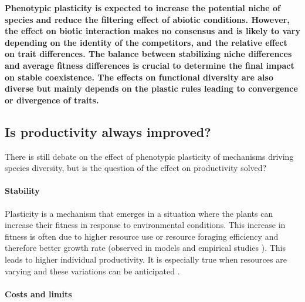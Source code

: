 

\textbf{Phenotypic plasticity is expected to increase the potential niche of species and reduce the filtering effect of abiotic conditions. However, the effect on biotic interaction makes no consensus and is likely to vary depending on the identity of the competitors, and the relative effect on trait differences. The balance between stabilizing niche differences and average fitness differences is crucial to determine the final impact on stable coexistence. The effects on functional diversity are also diverse but mainly depends on the plastic rules leading to convergence or divergence of traits.}


\subsection{Is productivity always improved?}

There is still debate on the effect of phenotypic plasticity of mechanisms driving species diversity, but is the question of the effect on productivity solved?

\paragraph{Stability}

Plasticity is a mechanism that emerges in a situation where the plants can increase their fitness in response to environmental conditions. This increase in fitness is often due to higher resource use or resource foraging efficiency and therefore better growth rate (observed in models \parencite{maire_plasticity_2013} and empirical studies \parencite{ hamann_evidence_2016}). This leads to higher individual productivity. It is especially true when resources are varying and these variations can be anticipated  \cite{richter_phenotypic_2012}.





\paragraph{Costs and limits}

